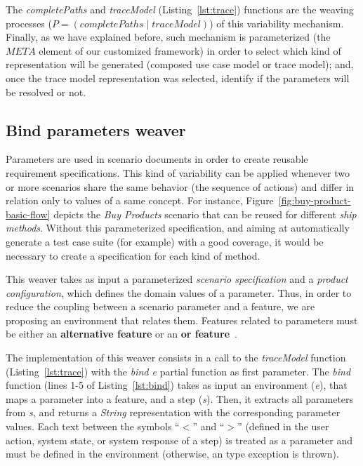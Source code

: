 \documentclass{llncs}
\begin{document}
The \emph{completePaths} and \emph{traceModel}
(Listing~\ref{lst:trace}) functions are the weaving processes ($P =
(completePaths \mid traceModel)$) of this variability mechanism.
Finally, as we have explained before, such mechanism is
parameterized (the $META$ element of our customized framework) in
order to select which kind of representation will be generated
(composed use case model or trace model); and, once the trace model
representation was selected, identify if the parameters will be
resolved or not.



\subsection{Bind parameters weaver}\label{sub:bind-weaver}

Parameters are used in scenario documents in order to create reusable
requirement specifications. This kind of variability can be applied
whenever two or more scenarios share the same behavior (the sequence
of actions) and differ in relation only to values of a same concept.
For instance, Figure~\ref{fig:buy-product-basic-flow} depicts the \emph{Buy Products} 
scenario that can be reused for different \emph{ship methods}. Without this
parameterized specification, and aiming at automatically generate a test case suite (for example) with a good coverage, 
it would be necessary to create a specification for each kind of method.

This weaver takes as input a parameterized \emph{scenario specification} and a
\emph{product configuration}, which defines the domain values of a
parameter. Thus, in order to reduce the coupling between a scenario parameter 
and a feature, we are proposing an environment that
relates them. Features related to parameters 
must be either an {\bf alternative feature} or an {\bf or
feature}~\cite{gheyi-alloy-06,czarnecki-wsfactory-2005,czarnecki-book}.

The implementation of this weaver consists in a call to 
the \emph{traceModel} function (Listing~\ref{lst:trace}) with
the \emph{bind e} partial function as first parameter. The
\emph{bind} function (lines 1-5 of Listing~\ref{lst:bind}) takes as
input an environment (\emph{e}), that maps a parameter into a
feature, and a step (\emph{s}). Then, it extracts all parameters
from \emph{s}, and returns a \emph{String} representation with the
corresponding parameter values. Each text between the symbols ``$<$'' and ``$>$''
(defined in the user action, system state, or system response of a
step) is treated as a parameter and must be defined in the
environment (otherwise, an type exception is thrown).
\end{document}
